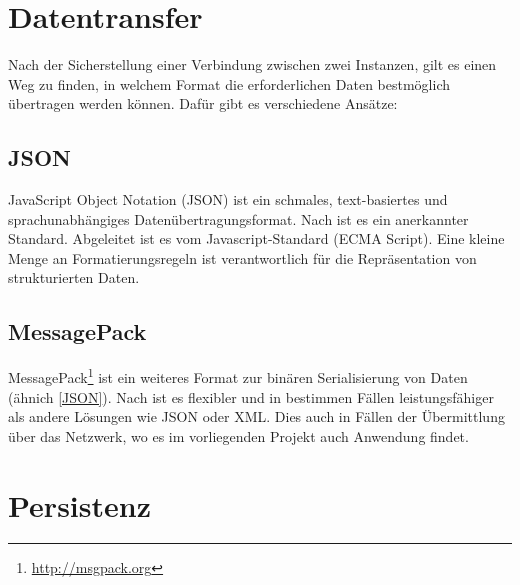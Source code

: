 \section{Datentransfer}\label{literatur-datentransfer}


Nach der Sicherstellung einer Verbindung zwischen zwei Instanzen, gilt es einen Weg zu finden, in welchem Format die erforderlichen Daten bestmöglich übertragen werden können. Dafür gibt es verschiedene Ansätze:


\subsection{JSON}\label{JSON}

   JavaScript Object Notation (JSON) ist ein schmales, text-basiertes und sprachunabhängiges Datenübertragungsformat. Nach \cite{bray2014json} ist es ein anerkannter Standard. Abgeleitet ist es vom Javascript-Standard (ECMA Script). Eine kleine Menge an Formatierungsregeln ist verantwortlich für die Repräsentation von strukturierten Daten.
   
   

\subsection{MessagePack}

MessagePack\footnote{\url{http://msgpack.org}} ist ein weiteres Format zur binären Serialisierung von Daten (ähnich \autoref{JSON}). Nach \cite{izzo2016biomedical} ist es flexibler und in bestimmen Fällen leistungsfähiger als andere Lösungen wie JSON oder XML. Dies auch in Fällen der Übermittlung über das Netzwerk, wo es im vorliegenden Projekt auch Anwendung findet.






\section{Persistenz}

